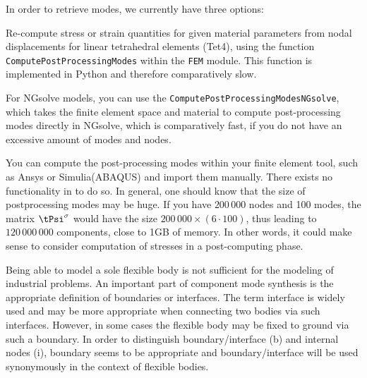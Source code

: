 In order to retrieve modes, we currently have three options:
\bi
  \item Re-compute stress or strain quantities for given material parameters from nodal displacements for linear tetrahedral elements (Tet4), using the function \texttt{ComputePostProcessingModes} within the \texttt{FEM} module. This function is implemented in Python and therefore comparatively slow.
  \item For NGsolve models, you can use the \texttt{ComputePostProcessingModesNGsolve}, which takes the finite element space and material to compute post-processing modes directly in NGsolve, which is comparatively fast, if you do not have an excessive amount of modes and nodes.
  \item You can compute the post-processing modes within your finite element tool, such as Ansys or Simulia(ABAQUS) and import them manually. There exists no functionality in \codeName to do so.
\ei
In general, one should know that the size of postprocessing modes may be huge. If you have $200\,000$ nodes and 100 modes, the matrix $\tPsi^{\sigma}$ would have the size $200\,000 \times (6 \cdot 100)$, thus leading to $120\,000\,000$ components, close to 1GB of memory. In other words, it could make sense to consider computation of stresses in a post-computing phase.

Being able to model a sole flexible body is not sufficient for the modeling of industrial problems.
An important part of component mode synthesis is the appropriate definition of boundaries or interfaces.
The term interface is widely used and may be more appropriate when connecting two bodies via such interfaces.
However, in some cases the flexible body may be fixed to ground via such a boundary. In order to distinguish boundary/interface (b) and internal nodes (i), boundary seems to be appropriate and boundary/interface will be used synonymously in the context of flexible bodies.

